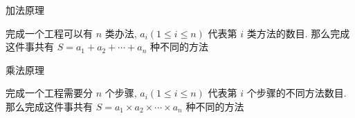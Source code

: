 \begin{frame}[fragile]{加法原理}
	\begin{definition}[加法原理]
		\label{cbasic:def:addp}
		完成一个工程可以有 \(n\) 类办法, \(a_i(1 \le i \le n)\) 代表第 \(i\) 类方法的数目. 那么完成这件事共有 \(S=a_1+a_2+\cdots +a_n\) 种不同的方法
	\end{definition}
\end{frame}


\begin{frame}[fragile]{乘法原理}
	\begin{definition}[乘法原理]
		\label{cbasic:def:mulp}
		完成一个工程需要分 \(n\) 个步骤, \(a_i(1 \le i \le n)\) 代表第 \(i\) 个步骤的不同方法数目. 那么完成这件事共有 \(S = a_1 \times a_2 \times \cdots \times a_n\) 种不同的方法
	\end{definition}
\end{frame}
